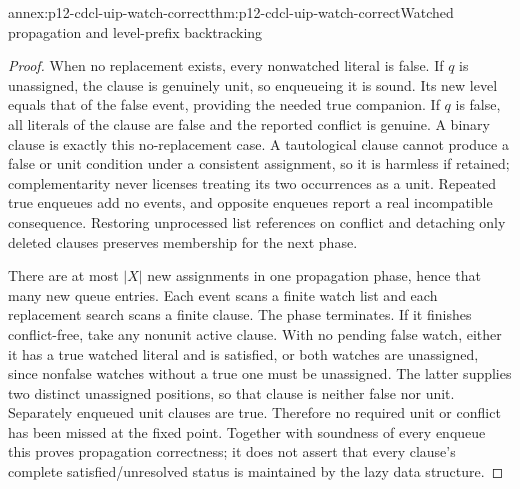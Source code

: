 \begin{annexitem}{annex:p12-cdcl-uip-watch-correct}{thm:p12-cdcl-uip-watch-correct}{Watched propagation and level-prefix backtracking}
\begin{proof}
When no replacement exists, every nonwatched literal is false.  If \(q\)
is unassigned, the clause is genuinely unit, so enqueueing it is sound.  Its
new level equals that of the false event, providing the needed true companion.
If \(q\) is false, all literals of the clause are false and the reported
conflict is genuine.  A binary clause is exactly this no-replacement case.
A tautological clause cannot produce a false or unit condition under a
consistent assignment, so it is harmless if retained; complementarity never
licenses treating its two occurrences as a unit.  Repeated true enqueues
add no events, and opposite enqueues report a real incompatible consequence.
Restoring unprocessed list references on conflict and detaching only deleted
clauses preserves membership for the next phase.

There are at most \(\lvert X\rvert\) new assignments in one propagation
phase, hence that many new queue entries.  Each event scans a finite watch
list and each replacement search scans a finite clause.  The phase terminates.
If it finishes conflict-free, take any nonunit active clause.  With no pending
false watch, either it has a true watched literal and is satisfied, or both
watches are unassigned, since nonfalse watches without a true one must be
unassigned.  The latter supplies two distinct unassigned positions, so that
clause is neither false nor unit.  Separately enqueued unit clauses are true.
Therefore no required unit or conflict has been missed at the fixed point.
Together with soundness of every enqueue this proves propagation correctness;
it does not assert that every clause's complete satisfied/unresolved status
is maintained by the lazy data structure.


\end{proof}
\end{annexitem}
